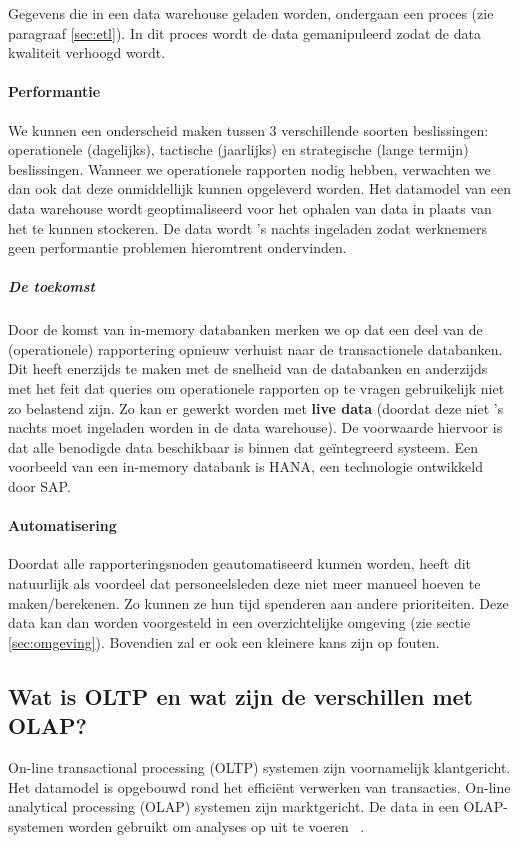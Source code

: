 Gegevens die in een data warehouse geladen worden, ondergaan een proces (zie paragraaf \ref{sec:etl}). In dit proces wordt de data gemanipuleerd zodat de data kwaliteit verhoogd wordt.

\paragraph{Performantie}
We kunnen een onderscheid maken tussen 3 verschillende soorten beslissingen: operationele (dagelijks), tactische (jaarlijks) en strategische (lange termijn) beslissingen. Wanneer we operationele rapporten nodig hebben, verwachten we dan ook dat deze onmiddellijk kunnen opgeleverd worden. Het datamodel van een data warehouse wordt geoptimaliseerd voor het ophalen van data in plaats van het te kunnen stockeren. De data wordt 's nachts ingeladen zodat werknemers geen performantie problemen hieromtrent ondervinden. 

\subparagraph{De toekomst}
Door de komst van in-memory databanken merken we op dat een deel van de (operationele) rapportering opnieuw verhuist naar de transactionele databanken. Dit heeft enerzijds te maken met de snelheid van de databanken en anderzijds met het feit dat queries om operationele rapporten op te vragen gebruikelijk niet zo belastend zijn. Zo kan er gewerkt worden met \textbf{live data} (doordat deze niet 's nachts moet ingeladen worden in de data warehouse). De voorwaarde hiervoor is dat alle benodigde data beschikbaar is binnen dat geïntegreerd systeem. Een voorbeeld van een in-memory databank is HANA, een technologie ontwikkeld door SAP.

\paragraph{Automatisering}
Doordat alle rapporteringsnoden geautomatiseerd kunnen worden, heeft dit natuurlijk als voordeel dat personeelsleden deze niet meer manueel hoeven te maken/berekenen. Zo kunnen ze hun tijd spenderen aan andere prioriteiten. Deze data kan dan worden voorgesteld in een overzichtelijke omgeving (zie sectie \ref{sec:omgeving}). Bovendien zal er ook een kleinere kans zijn op fouten.

\subsection{Wat is OLTP en wat zijn de verschillen met OLAP?}
\label{sec:oltp-vs-olap}
On-line transactional processing (OLTP) systemen zijn voornamelijk klantgericht. Het datamodel is opgebouwd rond het efficiënt verwerken van transacties. On-line analytical processing (OLAP) systemen zijn marktgericht. De data in een OLAP-systemen worden gebruikt om analyses op uit te voeren ~\autocite{Satyanarayana2010}.


